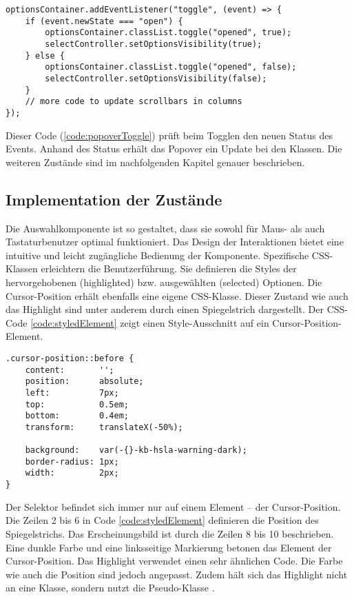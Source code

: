 \begin{lstlisting}[style = htmlcssjs, caption = Event-Handling für Popover-Toggle, label = code:popoverToggle]
optionsContainer.addEventListener("toggle", (event) => {
    if (event.newState === "open") {
        optionsContainer.classList.toggle("opened", true);
        selectController.setOptionsVisibility(true);
    } else {
        optionsContainer.classList.toggle("opened", false);
        selectController.setOptionsVisibility(false);
    }
    // more code to update scrollbars in columns
});
\end{lstlisting}

Dieser Code (\ref{code:popoverToggle}) prüft beim Togglen den neuen Status des Events. 
Anhand des Status erhält das Popover ein Update bei den Klassen. 
Die weiteren Zustände sind im nachfolgenden Kapitel genauer beschrieben. 


\subsection{Implementation der Zustände}
\label{sec:implementStates}

Die Auswahlkomponente ist so gestaltet, dass sie sowohl für Maus- als auch Tastaturbenutzer optimal funktioniert. 
Das Design der Interaktionen bietet eine intuitive und leicht zugängliche Bedienung der Komponente. 
Spezifische CSS-Klassen erleichtern die Benutzerführung. 
Sie definieren die Styles der hervorgehobenen (highlighted) bzw. ausgewählten (selected) Optionen. 
Die Cursor-Position erhält ebenfalls eine eigene CSS-Klasse. 
Dieser Zustand wie auch das Highlight sind unter anderem durch einen Spiegelstrich dargestellt. 
Der CSS-Code \ref{code:styledElement} zeigt einen Style-Ausschnitt auf ein Cursor-Position-Element. 

\begin{lstlisting}[style = htmlcssjs, caption = Spiegelstrich der Cursor-Position, label = code:styledElement]
.cursor-position::before {
    content:       '';
    position:      absolute;
    left:          7px;
    top:           0.5em;
    bottom:        0.4em;
    transform:     translateX(-50%);

    background:    var(-{}-kb-hsla-warning-dark);
    border-radius: 1px;
    width:         2px;
}
\end{lstlisting}

Der Selektor  befindet sich immer nur auf einem Element – der Cursor-Position. 
Die Zeilen 2 bis 6 in Code \ref{code:styledElement} definieren die Position des Spiegelstrichs. 
Das Erscheinungsbild ist durch die Zeilen 8 bis 10 beschrieben. 
Eine dunkle Farbe und eine linksseitige Markierung betonen das Element der Cursor-Position. 
Das Highlight verwendet einen sehr ähnlichen Code. 
Die Farbe wie auch die Position sind jedoch angepasst. 
Zudem hält sich das Highlight nicht an eine Klasse, sondern nutzt die Pseudo-Klasse . 

